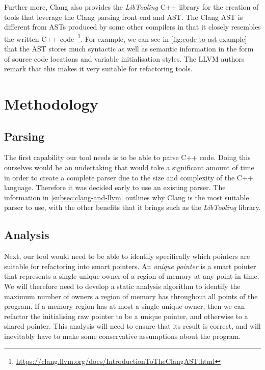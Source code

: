 \documentclass{mpaper}
\begin{document}
    Further more, Clang also provides the \emph{LibTooling} C++ library for the creation of tools that leverage the Clang parsing front-end and AST.
    The Clang AST is different from ASTs produced by some other compilers in that it closely resembles the written C++ code~\footnote{\url{https://clang.llvm.org/docs/IntroductionToTheClangAST.html}}.
    For example, we can see in \autoref{fig:code-to-ast-example} that the AST stores much syntactic as well as semantic information in the form of source code locations and variable initialisation styles.
    The LLVM authors remark that this makes it very suitable for refactoring tools.
    
    


    \section{Methodology}\label{sec:methodology}
    
    \subsection{Parsing}
    
    The first capability our tool needs is to be able to parse C++ code.
    Doing this ourselves would be an undertaking that would take a significant amount of time in order to create a complete parser due to the size and complexity of the C++ language. Therefore it was decided early to use an existing parser.
    The information in \autoref{subsec:clang-and-llvm} outlines why Clang is the most suitable parser to use, with the other benefits that it brings such as the \emph{LibTooling} library. 
    
    \subsection{Analysis}\label{subsec:methodology-analysis}
    
    Next, our tool would need to be able to identify specifically which pointers are suitable for refactoring into smart pointers.
    An \emph{unique pointer} is a smart pointer that represents a single unique owner of a region of memory at any point in time.
    We will therefore need to develop a static analysis algorithm to identify the maximum number of owners a region of memory has throughout all points of the program. 
    If a memory region has at most a single unique owner, then we can refactor the initialising raw pointer to be a unique pointer, and otherwise to a shared pointer.    
    This analysis will need to ensure that its result is correct, and will inevitably have to make some conservative assumptions about the program.
    
\end{document}
